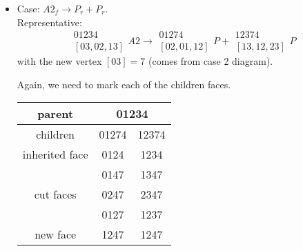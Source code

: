 \documentclass[a4paper,12pt]{amsart}
\numberwithin{equation}{section}
\begin{document}
\begin{itemize}
    
	\item Case: $A2_f \rightarrow P_r + P_r$. \\
	Representative: 
	$$ \begin{array}{c} 01234 \\ \left[03,02,13\right] \end{array} A2
	\rightarrow 
	\begin{array}{c} 01274 \\ \left[02,01,12\right] \end{array} P +
	\begin{array}{c} 12374 \\ \left[13,12,23\right] \end{array} P $$
	with the new vertex $\left[03\right] = 7$ (comes from case 2 diagram).
	
    Again, we need to mark each of the children faces. 
    
    \begin{minipage}[]{0.5\textwidth}
  \begin{center}
	
	\begin{tabular}{|c|c|c|} \hline
	parent & \multicolumn{2}{|c|}{01234} \\ \hline
	children & 01274 & 12374 \\ \hline
	inherited face & 0124 & 1234 \\ \hline
	\multirow{3}{*}{cut faces} & 0147 & 1347 \\ 
	 & 0247 & 2347 \\ 
	 & 0127 & 1237 \\ \hline
	 new face & 1247 & 1247 \\ \hline
	\end{tabular}
  \end{center}
\end{minipage}
\hfill
    \begin{minipage}[]{0.5\textwidth}
  \begin{center}
	

\end{center}
\end{minipage}
\end{itemize}
\end{document}
